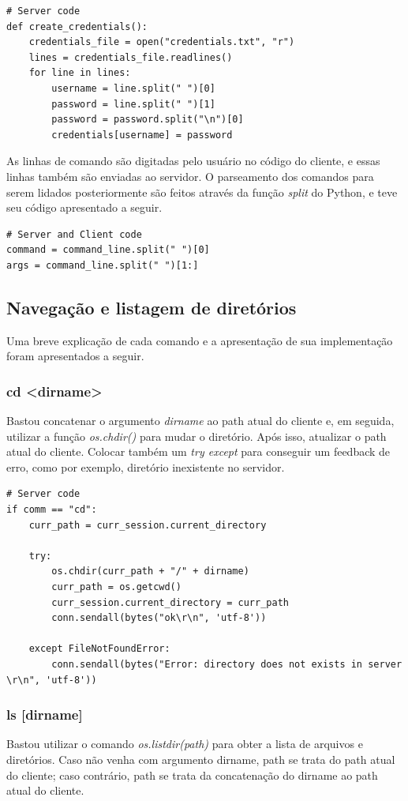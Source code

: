 \documentclass[conference]{IEEEtran}
\begin{document}
\begin{lstlisting}
# Server code
def create_credentials():
	credentials_file = open("credentials.txt", "r")
	lines = credentials_file.readlines()
	for line in lines:
		username = line.split(" ")[0]
		password = line.split(" ")[1]
		password = password.split("\n")[0]
		credentials[username] = password
\end{lstlisting}

As linhas de comando são digitadas pelo usuário no código do cliente, e essas linhas também são enviadas ao servidor. O parseamento dos comandos para serem lidados posteriormente são feitos através da função \textit{split} do Python, e teve seu código apresentado a seguir. 

\begin{lstlisting}
# Server and Client code
command = command_line.split(" ")[0]
args = command_line.split(" ")[1:]
\end{lstlisting}

\subsection{Navegação e listagem de diretórios}

Uma breve explicação de cada comando e a apresentação de sua implementação foram apresentados a seguir.

\subsubsection{cd <dirname>} Bastou concatenar o argumento \textit{dirname} ao path atual do cliente e, em seguida, utilizar a função \textit{os.chdir()} para mudar o diretório. Após isso, atualizar o path atual do cliente. Colocar também um \textit{try except} para conseguir um feedback de erro, como por exemplo, diretório inexistente no servidor.

\begin{lstlisting}
# Server code
if comm == "cd":
	curr_path = curr_session.current_directory

	try:
	    os.chdir(curr_path + "/" + dirname)
	    curr_path = os.getcwd()
	    curr_session.current_directory = curr_path
	    conn.sendall(bytes("ok\r\n", 'utf-8'))

	except FileNotFoundError:
	    conn.sendall(bytes("Error: directory does not exists in server \r\n", 'utf-8'))
\end{lstlisting}

\subsubsection{ls [dirname]} Bastou utilizar o comando \textit{os.listdir(path)} para obter a lista de arquivos e diretórios. Caso não venha com argumento dirname, path se trata do path atual do cliente; caso contrário, path se trata da concatenação do dirname ao path atual do cliente.
\end{document}
